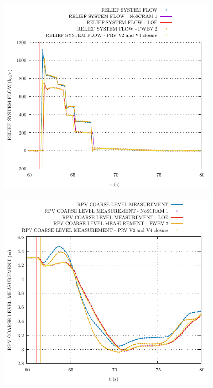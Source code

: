 \documentclass{article}
\begin{document}
\begin{multicols}{2}
\begin{figure}[H]
\centering
\includegraphics[width=\linewidth]{./graphs/RELIEF SYSTEM FLOW.pdf}
\end{figure}
\begin{figure}[H]
\centering
\includegraphics[width=\linewidth]{./graphs/RPV COARSE LEVEL MEASUREMENT.pdf}
\end{figure}
\begin{figure}[H]
\centering

\end{figure}
\end{multicols}
\end{document}
